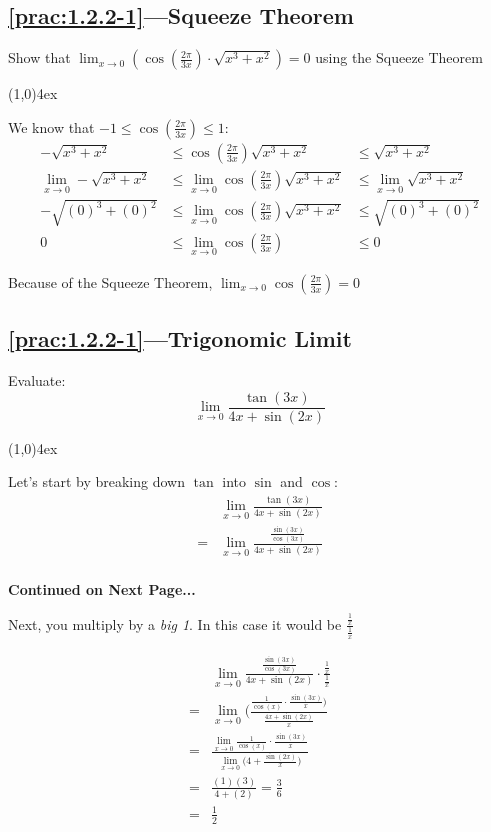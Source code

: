 \documentclass{MathNotes}
\newcommand{\br}{
\begin{center}
\line(1,0){4ex}
\end{center}}
\newcommand{\continued}{
\mbox{}
\vfill
\textbf{Continued on Next Page...}\newpage
}
\begin{document}
\subsection*{\ref{prac:1.2.2-1}---Squeeze Theorem}\label{ans:1.2.2-1}
Show that
$\displaystyle\lim_{x\to 0}(\cos(\frac{2\pi}{3x})\cdot\sqrt{x^3+x^2})=0$
using the Squeeze Theorem
\br
We know that $\displaystyle-1\leq\cos(\frac{2\pi}{3x})\leq 1$:
\begin{align*}
    -\sqrt{x^3+x^2}&\leq\cos(\frac{2\pi}{3x})\sqrt{x^3+x^2}&\leq
    \sqrt{x^3+x^2}
    \\
    \lim_{x\to 0}-\sqrt{x^3+x^2}&\leq\lim_{x\to 0}\cos(\frac{2\pi}{3x})
    \sqrt{x^3+x^2}&\leq\lim_{x\to 0}\sqrt{x^3+x^2}
    \\
    -\sqrt{(0)^3+(0)^2}&\leq\lim_{x\to 0}\cos(\frac{2\pi}{3x})
    \sqrt{x^3+x^2}&\leq\sqrt{(0)^3+(0)^2}
    \\
    0&\leq\lim_{x\to 0}\cos(\frac{2\pi}{3x})&\leq0 
\end{align*}

Because of the Squeeze Theorem, $\displaystyle\lim_{x\to 0}\cos(\frac{2\pi}{3x})=0$

\subsection*{\ref{prac:1.2.2-1}---Trigonomic Limit}\label{ans:1.2.2-2}
Evaluate:
$$\lim_{x\to 0}\frac{\tan(3x)}{4x+\sin(2x)}$$
\br

Let's start by breaking down $\tan$ into $\sin$ and $\cos$:
\begin{align*}
    &\lim_{x\to 0}\frac{\tan(3x)}{4x+\sin(2x)}\\
    =&\lim_{x\to 0}\frac{\frac{\sin(3x)}{\cos(3x)}}{4x+\sin(2x)}\\
\end{align*}
\continued

Next, you multiply by a \textit{big 1}. In this case it would be
$\displaystyle\frac{\frac{1}{x}}{\frac{1}{x}}$

\begin{align*}
    &\lim_{x\to 0}\frac{\frac{\sin(3x)}{\cos(3x)}}{4x+\sin(2x)}\cdot\frac{\frac{1}{x}}{\frac{1}{x}}\\
    =&\lim_{x\to 0}\big(\frac{\frac{1}{\cos(x)}\cdot\frac{\sin(3x)}{x}\big)}{\frac{4x+\sin(2x)}{x}}\\
    =&\frac{\lim_{x\to 0}\frac{1}{\cos(x)}\cdot\frac{\sin(3x)}{x}}{\lim_{x\to 0}\big(4+\frac{\sin(2x)}{x}\big)}\\
    =&\frac{(1)(3)}{4+(2)}=\frac{3}{6}\\
    =&\frac{1}{2}
\end{align*}
\end{document}
